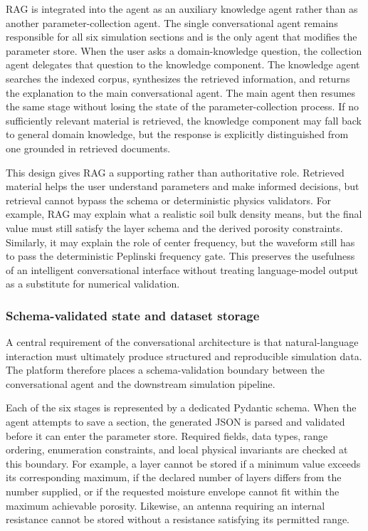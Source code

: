 \documentclass[journal]{IEEEtran}
\begin{document}
RAG is integrated into the agent as an auxiliary knowledge agent rather than as another parameter-collection agent. The single conversational agent remains responsible for all six simulation sections and is the only agent that modifies the parameter store. When the user asks a domain-knowledge question, the collection agent delegates that question to the knowledge component. The knowledge agent searches the indexed corpus, synthesizes the retrieved information, and returns the explanation to the main conversational agent. The main agent then resumes the same stage without losing the state of the parameter-collection process. If no sufficiently relevant material is retrieved, the knowledge component may fall back to general domain knowledge, but the response is explicitly distinguished from one grounded in retrieved documents.

This design gives RAG a supporting rather than authoritative role. Retrieved material helps the user understand parameters and make informed decisions, but retrieval cannot bypass the schema or deterministic physics validators. For example, RAG may explain what a realistic soil bulk density means, but the final value must still satisfy the layer schema and the derived porosity constraints. Similarly, it may explain the role of center frequency, but the waveform still has to pass the deterministic Peplinski frequency gate. This preserves the usefulness of an intelligent conversational interface without treating language-model output as a substitute for numerical validation.

\subsubsection{Schema-validated state and dataset storage}
A central requirement of the conversational architecture is that natural-language interaction must ultimately produce structured and reproducible simulation data. The platform therefore places a schema-validation boundary between the conversational agent and the downstream simulation pipeline.

Each of the six stages is represented by a dedicated Pydantic schema. When the agent attempts to save a section, the generated JSON is parsed and validated before it can enter the parameter store. Required fields, data types, range ordering, enumeration constraints, and local physical invariants are checked at this boundary. For example, a layer cannot be stored if a minimum value exceeds its corresponding maximum, if the declared number of layers differs from the number supplied, or if the requested moisture envelope cannot fit within the maximum achievable porosity. Likewise, an antenna requiring an internal resistance cannot be stored without a resistance satisfying its permitted range.
\end{document}
